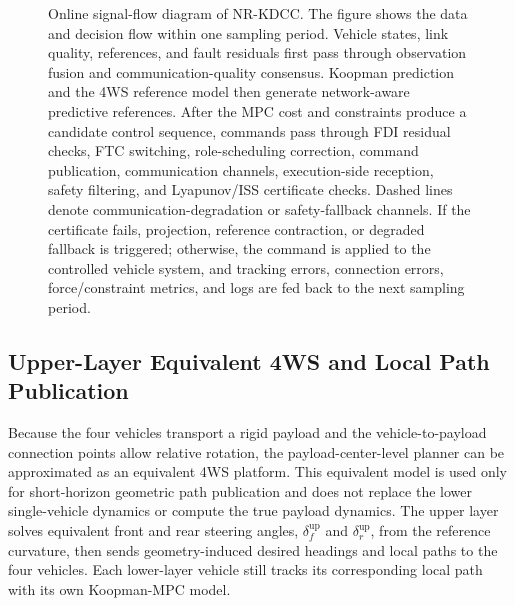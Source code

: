 \documentclass[twocolumn,3p,times,procedia]{elsarticle}
\newcommand{\Method}{NR-KDCC}
\begin{document}
\begin{figure}[t]
{}
\caption[Online signal flow of \Method{}]{Online signal-flow diagram of \Method{}. The figure shows the data and decision flow within one sampling period. Vehicle states, link quality, references, and fault residuals first pass through observation fusion and communication-quality consensus. Koopman prediction and the 4WS reference model then generate network-aware predictive references. After the MPC cost and constraints produce a candidate control sequence, commands pass through FDI residual checks, FTC switching, role-scheduling correction, command publication, communication channels, execution-side reception, safety filtering, and Lyapunov/ISS certificate checks. Dashed lines denote communication-degradation or safety-fallback channels. If the certificate fails, projection, reference contraction, or degraded fallback is triggered; otherwise, the command is applied to the controlled vehicle system, and tracking errors, connection errors, force/constraint metrics, and logs are fed back to the next sampling period.}
\label{fig:nrkdcc_flowchart}
\end{figure}

\subsection{Upper-Layer Equivalent 4WS and Local Path Publication}

Because the four vehicles transport a rigid payload and the vehicle-to-payload connection points allow relative rotation, the payload-center-level planner can be approximated as an equivalent 4WS platform. This equivalent model is used only for short-horizon geometric path publication and does not replace the lower single-vehicle dynamics or compute the true payload dynamics. The upper layer solves equivalent front and rear steering angles, $\delta_f^{\mathrm{up}}$ and $\delta_r^{\mathrm{up}}$, from the reference curvature, then sends geometry-induced desired headings and local paths to the four vehicles. Each lower-layer vehicle still tracks its corresponding local path with its own Koopman-MPC model.
\end{document}
